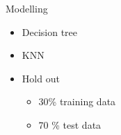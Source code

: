 \begin{frame}{Modelling}
    \begin{itemize}
        \item Decision tree
        \item KNN
        \item Hold out
        \begin{itemize}
            \item 30\% training data
            \item 70 \% test data
        \end{itemize}
    \end{itemize}
\end{frame}